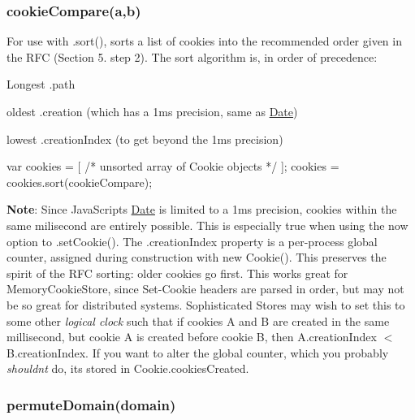 \subsubsection*{{\ttfamily cookie\+Compare(a,b)}}

For use with {\ttfamily .sort()}, sorts a list of cookies into the recommended order given in the R\+FC (Section 5. step 2). The sort algorithm is, in order of precedence\+:


\begin{DoxyItemize}
\item Longest {\ttfamily .path}
\item oldest {\ttfamily .creation} (which has a 1ms precision, same as {\ttfamily \mbox{\hyperlink{classDate}{Date}}})
\item lowest {\ttfamily .creation\+Index} (to get beyond the 1ms precision)
\end{DoxyItemize}


\begin{DoxyCode}
var cookies = [ /* unsorted array of Cookie objects */ ];
cookies = cookies.sort(cookieCompare);
\end{DoxyCode}


{\bfseries Note}\+: Since Java\+Script\textquotesingle{}s {\ttfamily \mbox{\hyperlink{classDate}{Date}}} is limited to a 1ms precision, cookies within the same milisecond are entirely possible. This is especially true when using the {\ttfamily now} option to {\ttfamily .set\+Cookie()}. The {\ttfamily .creation\+Index} property is a per-\/process global counter, assigned during construction with {\ttfamily new Cookie()}. This preserves the spirit of the R\+FC sorting\+: older cookies go first. This works great for {\ttfamily Memory\+Cookie\+Store}, since {\ttfamily Set-\/\+Cookie} headers are parsed in order, but may not be so great for distributed systems. Sophisticated {\ttfamily Store}s may wish to set this to some other {\itshape logical clock} such that if cookies A and B are created in the same millisecond, but cookie A is created before cookie B, then {\ttfamily A.\+creation\+Index $<$ B.\+creation\+Index}. If you want to alter the global counter, which you probably {\itshape shouldn\textquotesingle{}t} do, it\textquotesingle{}s stored in {\ttfamily Cookie.\+cookies\+Created}.

\subsubsection*{{\ttfamily permute\+Domain(domain)}}

